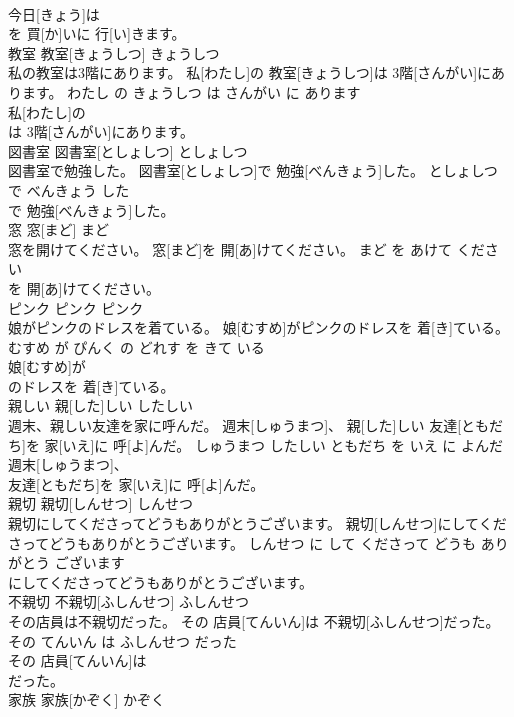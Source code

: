 \documentclass[8pt]{extreport}
\begin{document}
\begin{CJK}{UTF8}{min}
\\	今日[きょう]は
\\	を 買[か]いに 行[い]きます。			
\\	教室	教室[きょうしつ]	きょうしつ	
\\	私の教室は3階にあります。	私[わたし]の 教室[きょうしつ]は 3階[さんがい]にあります。	わたし の きょうしつ は さんがい に あります	
\\	私[わたし]の
\\	は 3階[さんがい]にあります。			
\\	図書室	図書室[としょしつ]	としょしつ	
\\	図書室で勉強した。	図書室[としょしつ]で 勉強[べんきょう]した。	としょしつ で べんきょう した	
\\	で 勉強[べんきょう]した。			
\\	窓	窓[まど]	まど	
\\	窓を開けてください。	窓[まど]を 開[あ]けてください。	まど を あけて ください	
\\	を 開[あ]けてください。			
\\	ピンク	ピンク	ピンク	
\\	娘がピンクのドレスを着ている。	娘[むすめ]がピンクのドレスを 着[き]ている。	むすめ が ぴんく の どれす を きて いる	
\\	娘[むすめ]が
\\	のドレスを 着[き]ている。			
\\	親しい	親[した]しい	したしい	
\\	週末、親しい友達を家に呼んだ。	週末[しゅうまつ]、 親[した]しい 友達[ともだち]を 家[いえ]に 呼[よ]んだ。	しゅうまつ したしい ともだち を いえ に よんだ	
\\	週末[しゅうまつ]、
\\	友達[ともだち]を 家[いえ]に 呼[よ]んだ。			
\\	親切	親切[しんせつ]	しんせつ	
\\	親切にしてくださってどうもありがとうございます。	親切[しんせつ]にしてくださってどうもありがとうございます。	しんせつ に して くださって どうも ありがとう ございます	
\\	にしてくださってどうもありがとうございます。			
\\	不親切	不親切[ふしんせつ]	ふしんせつ	
\\	その店員は不親切だった。	その 店員[てんいん]は 不親切[ふしんせつ]だった。	その てんいん は ふしんせつ だった	
\\	その 店員[てんいん]は
\\	だった。			
\\	家族	家族[かぞく]	かぞく	

\end{CJK}
\end{document}
